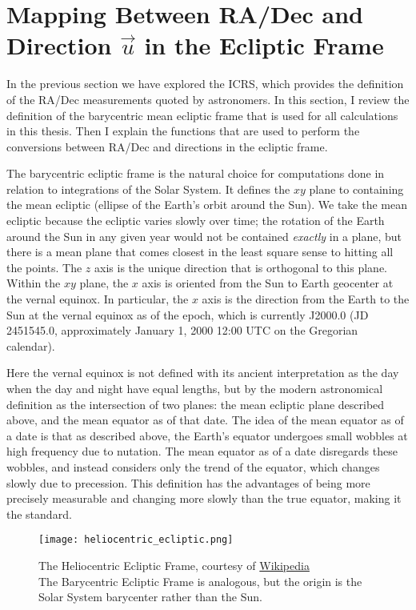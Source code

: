 \section{Mapping Between RA/Dec and Direction $\vec{u}$ in the Ecliptic Frame}
\label{section_ra_dec_to_dir}
In the previous section we have explored the ICRS, which provides the definition of the RA/Dec measurements quoted by astronomers.
In this section, I review the definition of the barycentric mean ecliptic frame that is used for all calculations in this thesis.
Then I explain the functions that are used to perform the conversions between RA/Dec and directions in the ecliptic frame.

The barycentric ecliptic frame is the natural choice for computations done in relation to integrations of the Solar System.
It defines the $xy$ plane to containing the mean ecliptic (ellipse of the Earth's orbit around the Sun).
We take the mean ecliptic because the ecliptic varies slowly over time; 
the rotation of the Earth around the Sun in any given year would not be contained \textit{exactly} in a plane,
but there is a mean plane that comes closest in the least square sense to hitting all the points.
The $z$ axis is the unique direction that is orthogonal to this plane.
Within the $xy$ plane, the $x$ axis is oriented from the Sun to Earth geocenter at the vernal equinox.
In particular, the $x$ axis is the direction from the Earth to the Sun at the vernal equinox as of the epoch, 
which is currently J2000.0 (JD 2451545.0, approximately January 1, 2000 12:00 UTC on the Gregorian calendar).

Here the vernal equinox is not defined with its ancient interpretation as the day when the day and night have equal lengths,
but by the modern astronomical definition as the intersection of two planes:
the mean ecliptic plane described above, and the mean equator as of that date.
The idea of the mean equator as of a date is that as described above, the Earth's equator undergoes small wobbles at high frequency due to nutation.
The mean equator as of a date disregards these wobbles, and instead considers only the trend of the equator, which changes slowly due to precession.
This definition has the advantages of being more precisely measurable and changing more slowly than the true equator, making it the standard.

\begin{figure}[hbt!]
\begin{center}
\texttt{[image: heliocentric\_ecliptic.png]}
\caption{The Heliocentric Ecliptic Frame, courtesy of \href{https://en.wikipedia.org/wiki/Ecliptic_coordinate_system}{Wikipedia}\\
The Barycentric Ecliptic Frame is analogous, but the origin is the Solar System barycenter rather than the Sun.}
\end{center}
\end{figure}

